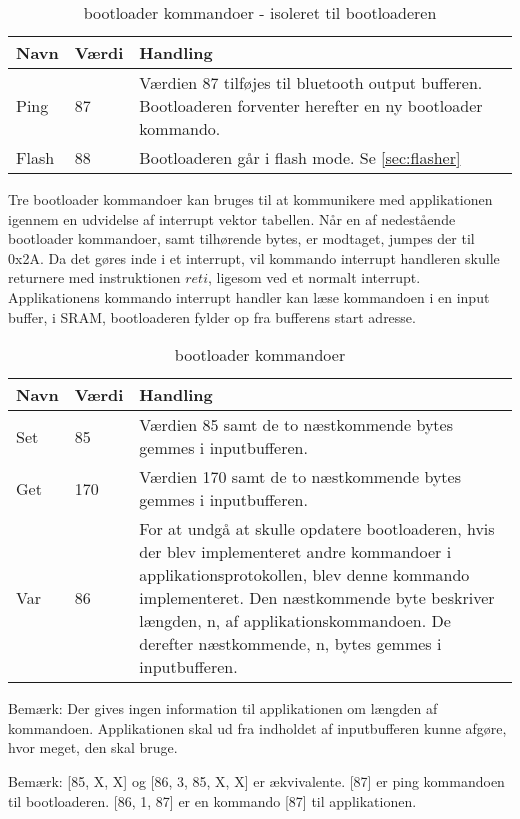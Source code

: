 \begin{table}[H]
	\caption{bootloader kommandoer - isoleret til bootloaderen}
	\label{tab:blappcommands}
	\centering

	\begin{tabular}{|l|l|p{13cm}|}
		\hline
		\textbf{Navn} & \textbf{Værdi} & \textbf{Handling} \\
		\hline
		Ping & 87 & Værdien 87 tilføjes til bluetooth output bufferen. Bootloaderen forventer herefter en ny bootloader kommando.\\
		\hline
		Flash & 88 & Bootloaderen går i flash mode. Se \ref{sec:flasher}
		\hline
	\end{tabular}
\end{table}

Tre bootloader kommandoer kan bruges til at kommunikere med applikationen igennem en udvidelse af interrupt vektor tabellen.
Når en af nedestående bootloader kommandoer, samt tilhørende bytes, er modtaget, jumpes der til 0x2A. Da det gøres inde i et interrupt, vil kommando interrupt handleren skulle returnere med instruktionen $reti$, ligesom ved et normalt interrupt. Applikationens kommando interrupt handler kan læse kommandoen i en input buffer, i SRAM, bootloaderen fylder op fra bufferens start adresse.

\begin{table}[H]
	\caption{bootloader kommandoer}
	\label{tab:blblcommands}
	\centering

	\begin{tabular}{|l|l|p{13cm}|}
		\hline
		\textbf{Navn} & \textbf{Værdi} & \textbf{Handling} \\
		\hline
		Set & 85 & Værdien 85 samt de to næstkommende bytes gemmes i inputbufferen.\\
		\hline
		Get & 170 & Værdien 170 samt de to næstkommende bytes gemmes i inputbufferen.\\
		\hline
		Var & 86 & For at undgå at skulle opdatere bootloaderen, hvis der blev implementeret andre kommandoer i applikationsprotokollen, blev denne kommando implementeret. Den næstkommende byte beskriver længden, n, af applikationskommandoen. De derefter næstkommende, n, bytes gemmes i inputbufferen.\\
		\hline
	\end{tabular}
\end{table}

\begin{mdquote}
	Bemærk: Der gives ingen information til applikationen om længden af kommandoen. Applikationen skal ud fra indholdet af inputbufferen kunne afgøre, hvor meget, den skal bruge.
\end{mdquote}
\begin{mdquote}
Bemærk: [85, X, X] og [86, 3, 85, X, X] er ækvivalente. [87] er ping kommandoen til bootloaderen. [86, 1, 87] er en kommando [87] til applikationen.
\end{mdquote}

